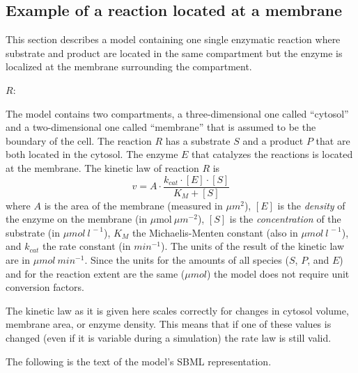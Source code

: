 

\subsection{Example of a reaction located at a membrane}
\label{sec:eg:membrane-reaction}

\label{sec:reaction-membrane-eg}This section describes a model containing
one single enzymatic reaction where substrate and product are located
in the same compartment but the enzyme is localized at the membrane
surrounding the compartment.

\begin{center}
$R$: 
\par\end{center}

The model contains two compartments, a three-dimensional one
called {}``cytosol'' and a two-dimensional one called
{}``membrane'' that is assumed to be the boundary of the cell. The
reaction $R$ has a substrate $S$ and a product $P$ that are both
located in the cytosol. The enzyme $E$ that catalyzes the
reactions is located at the membrane. The kinetic law of reaction
$R$ is\[ v=A\cdot\frac{k_{cat}\cdot[E]\cdot[S]}{K_{M}+[S]}\] where
$A$ is the area of the membrane (measured in $\mu m^{2}$), $[E]$
is the \emph{density }of the enzyme on the membrane (in
$\mu\mathrm{mol}~\mu m^{-2}$), $[S]$ is the \emph{concentration
}of the substrate (in $\mu mol~l^{\,-1}$), $K_{M}$ the
Michaelis-Menten constant (also in $\mu mol~l^{\,-1}$), and
$k_{cat}$ the rate constant (in $min^{-1}$). The units of the
result of the kinetic law are in $\mu mol~min^{-1}$. Since the
units for the amounts of all species ($S$, $P$, and $E$) and for
the reaction extent are the same ($\mu mol$) the model does not
require unit conversion factors.

The kinetic law as it is given here scales correctly for changes in
cytosol volume, membrane area, or enzyme density. This means that
if one of these values is changed (even if it is variable during a
simulation) the rate law is still valid.

The following is the text of the model's SBML representation.


